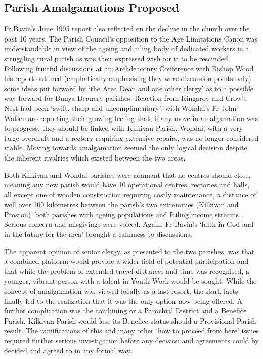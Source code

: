 \hypertarget{parish-amalgamations-proposed}{%
\subsection{Parish Amalgamations Proposed}\label{parish-amalgamations-proposed}}

Fr Bavin's June 1995 report also reflected on the decline in the church over the past 10 years. The Parish Council's opposition to the Age Limitations Canon was understandable in view of the ageing and ailing body of dedicated workers in a struggling rural parish as was their expressed wish for it to be rescinded. Following fruitful discussions at an Archdeaconry Conference with Bishop Wood his report outlined (emphatically emphasising they were discussion points only) some ideas put forward by `the Area Dean and one other clergy' as to a possible way forward for Bunya Deanery parishes. Reaction from Kingaroy and Crow's Nest had been `swift, sharp and uncomplimentary', with Wondai's Fr John Watlemaro reporting their growing feeling that, if any move in amalgamation was to progress, they should be linked with Kilkivan Parish. Wondai, with a very large overdraft and a rectory requiring extensive repairs, was no longer considered viable. Moving towards amalgamation seemed the only logical decision despite the inherent rivalries which existed between the two areas.

Both Kilkivan and Wondai parishes were adamant that no centres should close, meaning any new parish would have 10 operational centres, rectories and halls, all except one of wooden construction requiring costly maintenance, a distance of well over 100 kilometres between the parish's two extremities (Kilkivan and Proston), both parishes with ageing populations and failing income streams. Serious concern and misgivings were voiced. Again, Fr Bavin's `faith in God and in the future for the area' brought a calmness to discussions.

The apparent opinion of senior clergy, as presented to the two parishes, was that a combined platform would provide a wider field of potential participation and that while the problem of extended travel distances and time was recognised, a younger, vibrant person with a talent in Youth Work would be sought. While the concept of amalgamation was viewed locally as a last resort, the stark facts finally led to the realization that it was the only option now being offered. A further complication was the combining or a Parochial District and a Benefice Parish. Kilkivan Parish would lose its Benefice status should a Provisional Parish result. The ramifications of this and many other `how to proceed from here' issues required further serious investigation before any decision and agreements could by decided and agreed to in any formal way.

